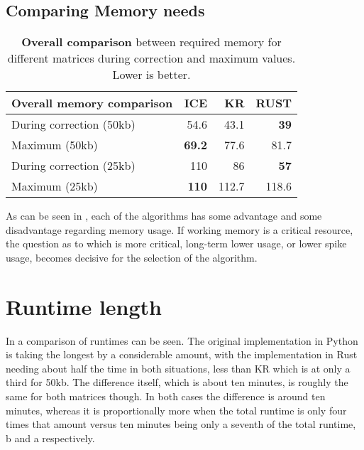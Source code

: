 \subsection{Comparing Memory needs}\label{sec:compmemory}

\begin{table}[!htbp]
    \begin{tabular}{lrrr}
        \textbf{Overall memory comparison} & ICE & KR & RUST \\
        \midrule
        During correction (50kb) &   54.6 & 43.1 & \textbf{39}   \\
        Maximum          (50kb) &   \textbf{69.2} & 77.6 & 81.7 \\
        During correction (25kb) &   110 & 86 & \textbf{57}  \\
        Maximum          (25kb) &   \textbf{110} & 112.7 & 118.6 \\
    \end{tabular}
    \caption[Memory needs comparison]
    {\textbf{Overall comparison} between required memory for different
    matrices during correction and maximum values. Lower is better.}
    \label{tab:compmem}
\end{table}

As can be seen in , each of the algorithms has some
advantage and some disadvantage regarding memory usage. If working memory is
a critical resource, the question as to which is more critical, long-term lower
usage, or lower spike usage, becomes decisive for the selection of the
algorithm.




\section{Runtime length}\label{sec:runtime}



In  a comparison of runtimes can be seen. The original
implementation in Python is taking the longest by a considerable amount, with
the implementation in Rust needing about half the time in both situations, less
than KR which is at only a third for 50kb. The difference itself, which is
about ten minutes, is roughly the same for both matrices though. In both cases
the difference is around ten minutes, whereas it is proportionally more when
the total runtime is only four times that amount versus ten minutes being only
a seventh of the total runtime, b and a
respectively.

